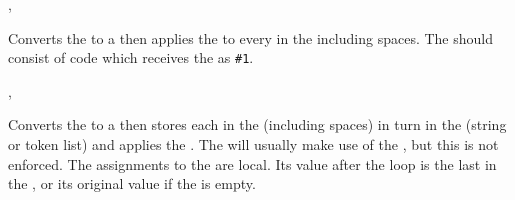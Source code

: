 \documentclass[oneside]{book}
\begin{document}
\begin{function}{\StrMapInline,\StrVarMapInline}
\begin{syntax}
  
  
\end{syntax}
Converts the  to a  then
applies the  to every  in the
 including spaces.
The  should consist of code which
receives the  as \verb|#1|.
\end{function}


\begin{function}{\StrMapVariable,\StrMapVariable}
\begin{syntax}
   
   
\end{syntax}
Converts the  to a  then stores each
 in the  (including spaces) in turn in
the (string or token list)  and applies the
.  The  will usually make use of the
, but this is not enforced.  The assignments to the
 are local.  Its value after the loop is the last
 in the , or its original value if the
 is empty.
\end{function}
\end{document}
